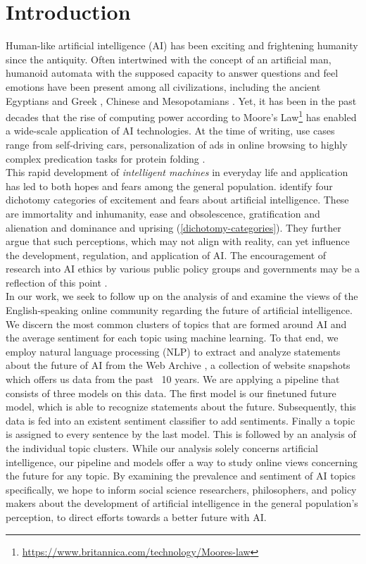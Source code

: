 \section{Introduction}

Human-like artificial intelligence (AI) has been exciting and frightening humanity since the antiquity.
Often intertwined with the concept of an artificial man, humanoid automata with the supposed capacity to answer questions and feel emotions have been present among all civilizations, including the ancient Egyptians and Greek \citep{Newquist1994}, Chinese \citep{cohen1986} and Mesopotamians \citep{unat2008}.
Yet, it has been in the past decades that the rise of computing power according to Moore’s Law\footnote{\url{https://www.britannica.com/technology/Moores-law}} has enabled a wide-scale application of AI technologies.
At the time of writing, use cases range from self-driving cars, personalization of ads in online browsing to highly complex predication tasks for protein folding \citep{jumper2021}.
\\
This rapid development of \emph{intelligent machines} in everyday life and application has led to both hopes and fears among the general population.
\citet{cave2019} identify four dichotomy categories of excitement and fears about artificial intelligence.
These are immortality and inhumanity, ease and obsolescence, gratification and alienation and dominance and uprising (\autoref{dichotomy-categories}).
They further argue that such perceptions, which may not align with reality, can yet influence the development, regulation, and application of AI.
The encouragement of research into AI ethics by various public policy groups and governments may be a reflection of this point \citep{leslie2019}.
\\
In our work, we seek to follow up on the analysis of \citet{cave2019} and examine the views of the English-speaking online community regarding the future of artificial intelligence. We discern the most common clusters of topics that are formed around AI and the average sentiment for each topic using machine learning. To that end, we employ natural language processing (NLP) to extract and analyze statements about the future of AI from the Web Archive \citep{Deckers2022}, a collection of website snapshots which offers us data from the past ~10 years.
We are applying a pipeline that consists of three models on this data.
The first model is our finetuned future model, which is able to recognize statements about the future.
Subsequently, this data is fed into an existent sentiment classifier  to add sentiments.
Finally a topic is assigned to every sentence by the last model.
This is followed by an analysis of the individual topic clusters.
While our analysis solely concerns artificial intelligence, our pipeline and models offer a way to study online views concerning the future for any topic. By examining the prevalence and sentiment of AI topics specifically, we hope to inform social science researchers, philosophers, and policy makers about the development of artificial intelligence in the general population’s perception, to direct efforts towards a better future with AI.

